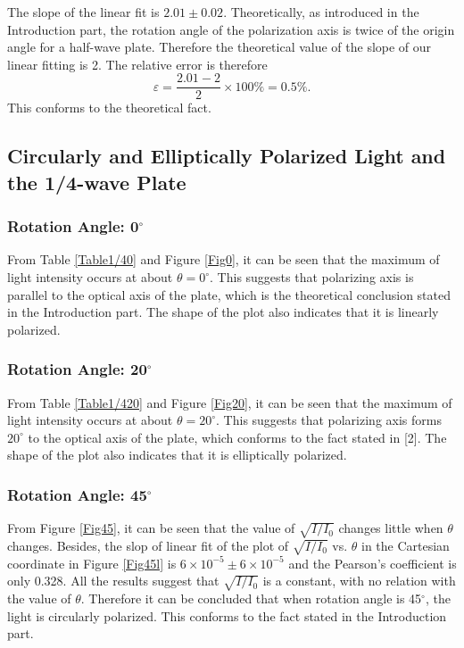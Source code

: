 \documentclass{article}
\begin{document}
The slope of the linear fit is $2.01 \pm 0.02$. Theoretically, as introduced in the Introduction part, the rotation angle of the polarization axis is twice of the origin angle for a half-wave plate. Therefore the theoretical value of the slope of our linear fitting is 2. The relative error is therefore
$$\varepsilon = \frac{2.01-2}{2}\times 100\% = 0.5\%.$$ 
This conforms to the theoretical fact.

\subsection{Circularly and Elliptically Polarized Light and the 1/4-wave Plate}

\subsubsection{Rotation Angle: 0$^\circ$}

From Table \ref{Table1/40} and Figure \ref{Fig0}, it can be seen that the 
maximum of light intensity occurs at about $\theta = 0^\circ$. This suggests that polarizing axis is parallel to the optical axis of the plate, which is the theoretical conclusion stated in the Introduction part. The shape of the plot also indicates that it is linearly polarized.

\subsubsection{Rotation Angle: 20$^\circ$}

From Table \ref{Table1/420} and Figure \ref{Fig20}, it can be seen that the 
maximum of light intensity occurs at about $\theta = 20^\circ$. This suggests that polarizing axis forms $20^\circ$ to the optical axis of the plate, which conforms to the fact stated in [2]. The shape of the plot also indicates that it is elliptically polarized.

\subsubsection{Rotation Angle: 45$^\circ$}

From Figure \ref{Fig45}, it can be seen that the value of $\sqrt{I/I_0}$ changes little when $\theta$ changes. Besides, the slop of linear fit of the plot of $\sqrt{I/I_0}$ vs. $\theta$ in the Cartesian coordinate in Figure \ref{Fig45l} is $6 \times 10^{-5} \pm 6 \times 10^{-5}$ and the Pearson's coefficient is only 0.328. All the results suggest that $\sqrt{I/I_0}$ is a constant, with no relation with the value of $\theta$. Therefore it can be concluded that when rotation angle is 45$^\circ$, the light is circularly polarized. This conforms to the fact stated in the Introduction part.
\end{document}
